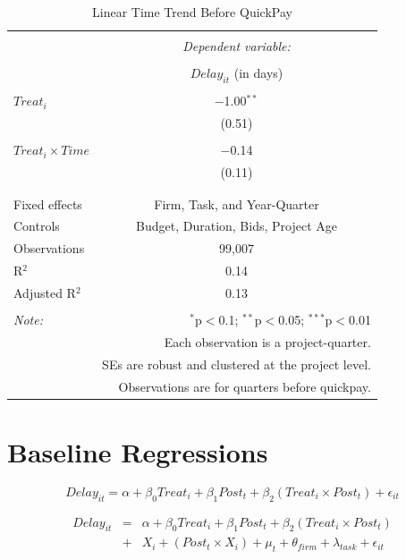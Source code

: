 \documentclass[
]{article}
\begin{document}
\begin{table}[H] \centering 
  \caption{Linear Time Trend Before QuickPay} 
  \label{} 
\small 
\begin{tabular}{@{\extracolsep{5pt}}lc} 
\\[-1.8ex]\hline 
\hline \\[-1.8ex] 
 & \multicolumn{1}{c}{\textit{Dependent variable:}} \\ 
\cline{2-2} 
\\[-1.8ex] & $Delay_{it}$ (in days) \\ 
\hline \\[-1.8ex] 
 $Treat_i$ & $-$1.00$^{**}$ \\ 
  & (0.51) \\ 
  & \\ 
 $Treat_i \times Time$ & $-$0.14 \\ 
  & (0.11) \\ 
  & \\ 
\hline \\[-1.8ex] 
Fixed effects & Firm, Task, and Year-Quarter \\ 
Controls & Budget, Duration, Bids, Project Age \\ 
Observations & 99,007 \\ 
R$^{2}$ & 0.14 \\ 
Adjusted R$^{2}$ & 0.13 \\ 
\hline 
\hline \\[-1.8ex] 
\textit{Note:}  & \multicolumn{1}{r}{$^{*}$p$<$0.1; $^{**}$p$<$0.05; $^{***}$p$<$0.01} \\ 
 & \multicolumn{1}{r}{Each observation is a project-quarter.} \\ 
 & \multicolumn{1}{r}{SEs are robust and clustered at the project level.} \\ 
 & \multicolumn{1}{r}{Observations are for quarters before quickpay.} \\ 
\end{tabular} 
\end{table}

\hypertarget{baseline-regressions}{%
\section{Baseline Regressions}\label{baseline-regressions}}

\[ Delay_{it} = \alpha+\beta_0 Treat_i + \beta_1 Post_t + \beta_2 (Treat_i \times Post_t) + \epsilon_{it}\]

\[ \begin{aligned} Delay_{it} &=& \alpha+\beta_0 Treat_i + \beta_1 Post_t + \beta_2 (Treat_i \times Post_t)\\
&+&  X_i + (Post_t \times X_i) + \mu_t + \theta_{firm} + \lambda_{task}+ \epsilon_{it}
\end{aligned}\]
\end{document}
